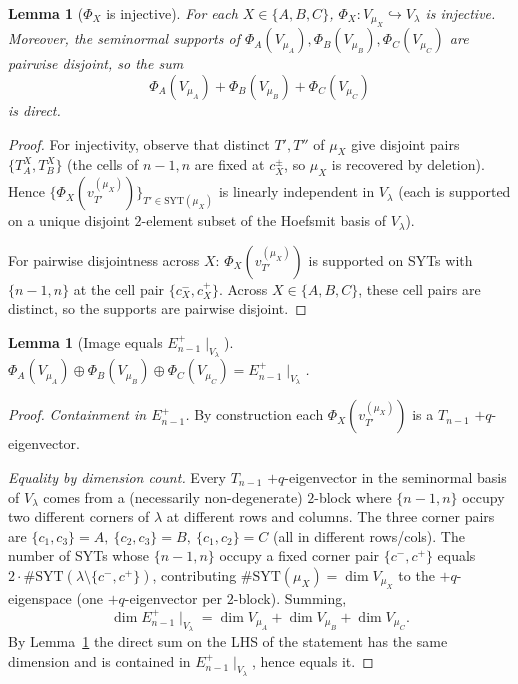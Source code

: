 \documentclass[11pt]{article}
\newtheorem{lemma}[theorem]{Lemma}
\theoremstyle{definition}
\begin{document}
\begin{lemma}[$\Phi_X$ is injective]\label{lem:Phi-inj}
For each $X\in\{A,B,C\}$, $\Phi_X:V_{\mu_X}\hookrightarrow V_\lambda$
is injective.  Moreover, the seminormal supports of
$\Phi_A(V_{\mu_A}),\Phi_B(V_{\mu_B}),\Phi_C(V_{\mu_C})$ are pairwise
disjoint, so the sum
\[
   \Phi_A(V_{\mu_A})+\Phi_B(V_{\mu_B})+\Phi_C(V_{\mu_C})
\]
is direct.
\end{lemma}

\begin{proof}
For injectivity, observe that distinct $T',T''$ of $\mu_X$ give
disjoint pairs $\{T^X_A,T^X_B\}$ (the cells of $n-1,n$ are fixed at
$c_X^\pm$, so $\mu_X$ is recovered by deletion).  Hence
$\{\Phi_X(v_{T'}^{(\mu_X)})\}_{T'\in\mathrm{SYT}(\mu_X)}$ is
linearly independent in $V_\lambda$ (each is supported on a unique
disjoint $2$-element subset of the Hoefsmit basis of $V_\lambda$).

For pairwise disjointness across $X$:  $\Phi_X(v_{T'}^{(\mu_X)})$ is
supported on SYTs with $\{n-1,n\}$ at the cell pair
$\{c_X^-,c_X^+\}$.  Across $X\in\{A,B,C\}$, these cell pairs are
distinct, so the supports are pairwise disjoint.
\end{proof}

\begin{lemma}[Image equals $E_{n-1}^+\!\mid_{V_\lambda}$]\label{lem:Phi-image}
$\Phi_A(V_{\mu_A})\oplus\Phi_B(V_{\mu_B})\oplus\Phi_C(V_{\mu_C})
=E_{n-1}^+\!\mid_{V_\lambda}$.
\end{lemma}

\begin{proof}
\emph{Containment in $E_{n-1}^+$.}  By construction each
$\Phi_X(v_{T'}^{(\mu_X)})$ is a $T_{n-1}$ $+q$-eigenvector.

\emph{Equality by dimension count.}  Every $T_{n-1}$ $+q$-eigenvector
in the seminormal basis of $V_\lambda$ comes from a (necessarily
non-degenerate) $2$-block where $\{n-1,n\}$ occupy two different
corners of $\lambda$ at different rows and columns.  The three
corner pairs are $\{c_1,c_3\}=A,\ \{c_2,c_3\}=B,\ \{c_1,c_2\}=C$
(all in different rows/cols).  The number of SYTs whose
$\{n-1,n\}$ occupy a fixed corner pair $\{c^-,c^+\}$ equals
$2\cdot\#\mathrm{SYT}(\lambda\setminus\{c^-,c^+\})$, contributing
$\#\mathrm{SYT}(\mu_X)=\dim V_{\mu_X}$ to the $+q$-eigenspace
(one $+q$-eigenvector per $2$-block).  Summing,
\[
   \dim E_{n-1}^+\!\mid_{V_\lambda}
   =\dim V_{\mu_A}+\dim V_{\mu_B}+\dim V_{\mu_C}.
\]
By Lemma~\ref{lem:Phi-inj} the direct sum on the LHS of the
statement has the same dimension and is contained in
$E_{n-1}^+\!\mid_{V_\lambda}$, hence equals it.
\end{proof}
\end{document}
